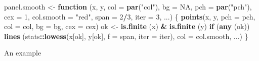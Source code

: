 \documentclass[
]{book}
\newenvironment{Shaded}{\begin{snugshade}}{\end{snugshade}}
\newcommand{\AttributeTok}[1]{\textcolor[rgb]{0.13,0.29,0.53}{#1}}
\newcommand{\ConstantTok}[1]{\textcolor[rgb]{0.56,0.35,0.01}{#1}}
\newcommand{\ControlFlowTok}[1]{\textcolor[rgb]{0.13,0.29,0.53}{\textbf{#1}}}
\newcommand{\DecValTok}[1]{\textcolor[rgb]{0.00,0.00,0.81}{#1}}
\newcommand{\FunctionTok}[1]{\textcolor[rgb]{0.13,0.29,0.53}{\textbf{#1}}}
\newcommand{\NormalTok}[1]{#1}
\newcommand{\OtherTok}[1]{\textcolor[rgb]{0.56,0.35,0.01}{#1}}
\newcommand{\SpecialCharTok}[1]{\textcolor[rgb]{0.81,0.36,0.00}{\textbf{#1}}}
\newcommand{\StringTok}[1]{\textcolor[rgb]{0.31,0.60,0.02}{#1}}
\begin{document}
\begin{Shaded}
\begin{Highlighting}[]
\NormalTok{panel.smooth }\OtherTok{\textless{}{-}} \ControlFlowTok{function}\NormalTok{ (x, y, }\AttributeTok{col =} \FunctionTok{par}\NormalTok{(}\StringTok{"col"}\NormalTok{), }\AttributeTok{bg =} \ConstantTok{NA}\NormalTok{, }\AttributeTok{pch =} \FunctionTok{par}\NormalTok{(}\StringTok{"pch"}\NormalTok{), }
                          \AttributeTok{cex =} \DecValTok{1}\NormalTok{, }\AttributeTok{col.smooth =} \StringTok{"red"}\NormalTok{, }\AttributeTok{span =} \DecValTok{2}\SpecialCharTok{/}\DecValTok{3}\NormalTok{, }\AttributeTok{iter =} \DecValTok{3}\NormalTok{, }
\NormalTok{                          ...) }
\NormalTok{\{ }\FunctionTok{points}\NormalTok{(x, y, }\AttributeTok{pch =}\NormalTok{ pch, }\AttributeTok{col =}\NormalTok{ col, }\AttributeTok{bg =}\NormalTok{ bg, }\AttributeTok{cex =}\NormalTok{ cex)}
\NormalTok{  ok }\OtherTok{\textless{}{-}} \FunctionTok{is.finite}\NormalTok{ (x) }\SpecialCharTok{\&} \FunctionTok{is.finite}\NormalTok{ (y)}
  \ControlFlowTok{if}\NormalTok{ (}\FunctionTok{any}\NormalTok{ (ok)) }
  \FunctionTok{lines}\NormalTok{ (stats}\SpecialCharTok{::}\FunctionTok{lowess}\NormalTok{(x[ok], y[ok], }\AttributeTok{f =}\NormalTok{ span, }\AttributeTok{iter =}\NormalTok{ iter), }
         \AttributeTok{col =}\NormalTok{ col.smooth, ...)}
\NormalTok{\}}
\end{Highlighting}
\end{Shaded}

An example
\end{document}
